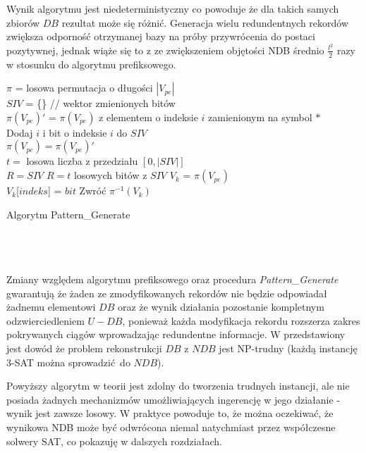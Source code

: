 Wynik algorytmu jest niedeterministyczny co powoduje że dla takich samych zbiorów $DB$ rezultat może się różnić. Generacja wielu redundentnych rekordów zwiększa odporność otrzymanej bazy na próby przywrócenia do postaci pozytywnej, jednak wiąże się to z ze zwiększeniem objętości NDB średnio $\frac{l^2}{2}$ razy w stosunku do algorytmu prefiksowego.


\begin{algorithm}[!htb]
    \SetAlgoLined
    
    $\pi$ = losowa permutacja o długości $|V_{pe}|$\\
    $SIV$ = \{\} // wektor zmienionych bitów\\
    {
        $\pi(V_{pe})'$ = $\pi(V_{pe})$ z elementem o indeksie $i$ zamienionym na symbol $*$\\
        {
            Dodaj $i$ i bit o indeksie $i$ do $SIV$\\
            $\pi(V_{pe}) = \pi(V_{pe})'$\\
        }  
    }
    $t =$ losowa liczba z przedziału $[0, |SIV|]$\\
    {
        $R = SIV$
    }
    \Else
    {
        $R = t$ losowych bitów z $SIV$ 
    }
    $V_k$ = $\pi(V_{pe})$\\
    {
        $V_k$[$indeks$] = $bit$
    }
    Zwróć $\pi^{-1}(V_k)$ 
    
    \caption{Algorytm Pattern\_Generate}
    \label{alg:pattern-generate}
\end{algorithm}
~\\\\\\

\newpage
Zmiany względem algorytmu prefiksowego oraz procedura \textit{Pattern\_Generate} gwarantują że żaden ze zmodyfikowanych rekordów nie będzie odpowiadał żadnemu elementowi $DB$ oraz że wynik działania pozostanie kompletnym odzwierciedleniem $U - DB$,
ponieważ każda modyfikacja rekordu rozszerza zakres pokrywanych ciągów wprowadzając redundentne informacje.
W \cite{NRI-Esponda} przedstawiony jest dowód że problem rekonstrukcji $DB$ z $NDB$ jest NP-trudny (każdą instancję 3-SAT można sprowadzić do $NDB$).

Powyższy algorytm w teorii jest zdolny do tworzenia trudnych instancji, ale nie posiada żadnych mechanizmów umożliwiających ingerencję w jego działanie - wynik jest zawsze losowy.
W praktyce powoduje to, że można oczekiwać, że wynikowa NDB może być odwrócona niemal natychmiast przez współczesne solwery SAT, co pokazuję w dalszych rozdziałach.       



